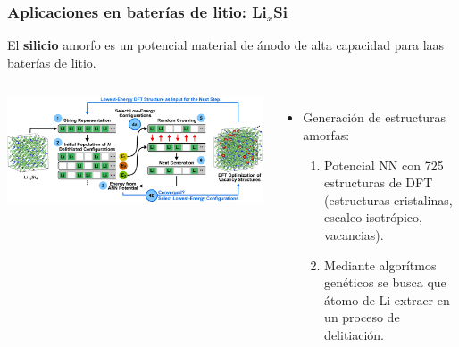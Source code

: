 \documentclass[aspectratio=169]{beamer}
\let\oldtextbf\textbf
\renewcommand{\textbf}[1]{\textcolor{nordblue}{\oldtextbf{#1}}}
\begin{document}
    \begin{frame}
        \frametitle{Aplicaciones en baterías de litio: Li$_x$Si}
        
        El \textbf{silicio} amorfo es un potencial material de ánodo de alta
        capacidad para laas baterías de litio.
        
        \begin{columns}
            \begin{center}
                \includegraphics[width=\columnwidth]{LiSi-metodo.png}
            \end{center}

            \begin{itemize}
                \item Generación de estructuras amorfas:
                    \begin{enumerate}
                        \item Potencial NN con 725 estructuras de DFT (estructuras
                            cristalinas, escaleo isotrópico, vacancias).
                        \item Mediante algorítmos genéticos se busca que átomo 
                            de Li extraer en un proceso de delitiación.
                    \end{enumerate}
            \end{itemize}
        \end{columns}
            
    \end{frame}
    
\end{document}
